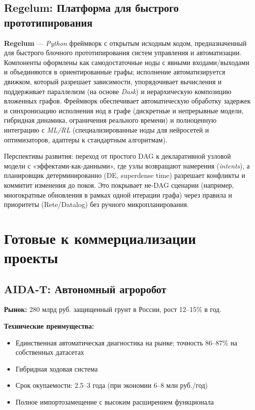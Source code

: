 \documentclass[12pt,a4paper]{article}
\begin{document}
\subsection{Regelum: Платформа для быстрого прототипирования}
\textbf{Regelum} — \textit{Python} фреймворк с открытым исходным кодом, предназначенный для быстрого блочного прототипирования систем управления и автоматизации. Компоненты оформлены как самодостаточные ноды с явными входами/выходами и объединяются в ориентированные графы; исполнение автоматизируется движком, который разрешает зависимости, упорядочивает вычисления и поддерживает параллелизм (на основе \textit{Dask}) и иерархическую композицию вложенных графов. Фреймворк обеспечивает автоматическую обработку задержек и синхронизацию исполнения нод в графе (дискретные и непрерывные модели, гибридная динамика, ограничения реального времени) и полноценную интеграцию с \textit{ML/RL} (специализированные ноды для нейросетей и оптимизаторов, адаптеры к стандартным алгоритмам). 

Перспективы развития: переход от простого DAG к декларативной узловой модели с «эффектами‑как‑данными», где узлы возвращают намерения (\textit{intents}), а планировщик детерминированно (DE, superdense time) разрешает конфликты и коммитит изменения до покоя. Это покрывает не‑DAG сценарии (например, многократные обновления в рамках одной итерации графа) через правила и приоритеты (Rete/Datalog) без ручного микропланирования.

\section{Готовые к коммерциализации проекты}
\subsection{AIDA-T: Автономный агроробот}
\textbf{Рынок:} 280 млрд руб. защищенный грунт в России, рост 12–15\% в год.

\textbf{Технические преимущества:}
\begin{itemize}
    \item Единственная автоматическая диагностика на рынке; точность 86–87\% на собственных датасетах
    \item Гибридная ходовая система
    \item Срок окупаемости: 2.5–3 года (при экономии 6–8 млн руб./год)
    \item Полное импортозамещение с высоким расширением функционала
\end{itemize}
\end{document}
